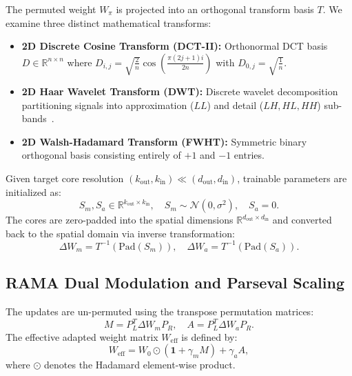 \documentclass{article}
\begin{document}
The permuted weight $W_\pi$ is projected into an orthogonal transform basis $T$. We examine three distinct mathematical transforms:
\begin{itemize}
    \item \textbf{2D Discrete Cosine Transform (DCT-II):} Orthonormal DCT basis $D \in \mathbb{R}^{n \times n}$ where $D_{i,j} = \sqrt{\frac{2}{n}} \cos\left(\frac{\pi (2j+1)i}{2n}\right)$ with $D_{0, j} = \sqrt{\frac{1}{n}}$.
    \item \textbf{2D Haar Wavelet Transform (DWT):} Discrete wavelet decomposition partitioning signals into approximation ($LL$) and detail ($LH, HL, HH$) sub-bands~\cite{mallat1999wavelet}.
    \item \textbf{2D Walsh-Hadamard Transform (FWHT):} Symmetric binary orthogonal basis consisting entirely of $+1$ and $-1$ entries.
\end{itemize}

Given target core resolution $(k_{\text{out}}, k_{\text{in}}) \ll (d_{\text{out}}, d_{\text{in}})$, trainable parameters are initialized as:
\begin{equation}
S_m, S_a \in \mathbb{R}^{k_{\text{out}} \times k_{\text{in}}}, \quad S_m \sim \mathcal{N}(0, \sigma^2), \quad S_a = 0.
\end{equation}
The cores are zero-padded into the spatial dimensions $\mathbb{R}^{d_{\text{out}} \times d_{\text{in}}}$ and converted back to the spatial domain via inverse transformation:
\begin{equation}
\Delta W_m = T^{-1}(\text{Pad}(S_m)), \quad \Delta W_a = T^{-1}(\text{Pad}(S_a)).
\end{equation}

\subsection{RAMA Dual Modulation and Parseval Scaling}

The updates are un-permuted using the transpose permutation matrices:
\begin{equation}
M = P_L^T \Delta W_m P_R, \quad A = P_L^T \Delta W_a P_R.
\end{equation}
The effective adapted weight matrix $W_{\text{eff}}$ is defined by:
\begin{equation}
W_{\text{eff}} = W_0 \odot \left(\mathbf{1} + \gamma_m M\right) + \gamma_a A,
\end{equation}
where $\odot$ denotes the Hadamard element-wise product.
\end{document}
